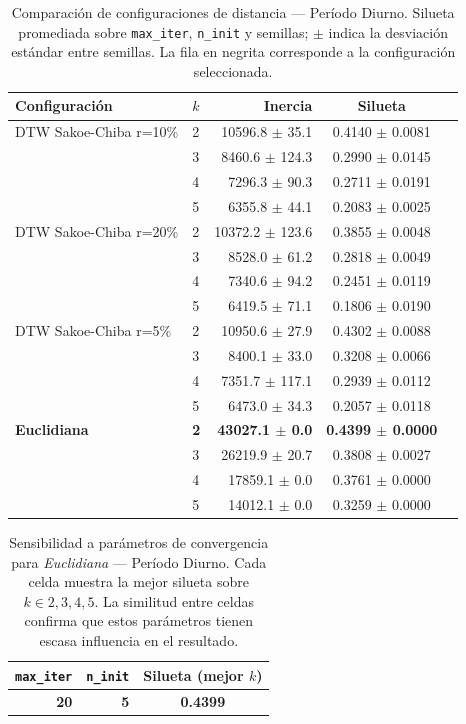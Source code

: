 \begin{table}[ht]
  \centering
  \caption{Comparación de configuraciones de distancia — Período Diurno. Silueta promediada sobre \texttt{max\_iter}, \texttt{n\_init} y semillas; $\pm$ indica la desviación estándar entre semillas. La fila en negrita corresponde a la configuración seleccionada.}
  \label{tab:tuning_config_daytime}
  \begin{tabular}{llrcc}
    \toprule
    \textbf{Configuración} & \textbf{$k$} & \textbf{Inercia} & \textbf{Silueta} \\
    \midrule
    DTW Sakoe-Chiba r=10\% & 2 & 10596.8 $\pm$ 35.1 & 0.4140 $\pm$ 0.0081 \\
     & 3 & 8460.6 $\pm$ 124.3 & 0.2990 $\pm$ 0.0145 \\
     & 4 & 7296.3 $\pm$ 90.3 & 0.2711 $\pm$ 0.0191 \\
     & 5 & 6355.8 $\pm$ 44.1 & 0.2083 $\pm$ 0.0025 \\
    DTW Sakoe-Chiba r=20\% & 2 & 10372.2 $\pm$ 123.6 & 0.3855 $\pm$ 0.0048 \\
     & 3 & 8528.0 $\pm$ 61.2 & 0.2818 $\pm$ 0.0049 \\
     & 4 & 7340.6 $\pm$ 94.2 & 0.2451 $\pm$ 0.0119 \\
     & 5 & 6419.5 $\pm$ 71.1 & 0.1806 $\pm$ 0.0190 \\
    DTW Sakoe-Chiba r=5\% & 2 & 10950.6 $\pm$ 27.9 & 0.4302 $\pm$ 0.0088 \\
     & 3 & 8400.1 $\pm$ 33.0 & 0.3208 $\pm$ 0.0066 \\
     & 4 & 7351.7 $\pm$ 117.1 & 0.2939 $\pm$ 0.0112 \\
     & 5 & 6473.0 $\pm$ 34.3 & 0.2057 $\pm$ 0.0118 \\
    \textbf{Euclidiana} & \textbf{2} & \textbf{43027.1 $\pm$ 0.0} & \textbf{0.4399 $\pm$ 0.0000} \\
     & 3 & 26219.9 $\pm$ 20.7 & 0.3808 $\pm$ 0.0027 \\
     & 4 & 17859.1 $\pm$ 0.0 & 0.3761 $\pm$ 0.0000 \\
     & 5 & 14012.1 $\pm$ 0.0 & 0.3259 $\pm$ 0.0000 \\
    \bottomrule
  \end{tabular}
\end{table}

\begin{table}[ht]
  \centering
  \caption{Sensibilidad a parámetros de convergencia para \textit{Euclidiana} — Período Diurno. Cada celda muestra la mejor silueta sobre $k \in {2,3,4,5}$. La similitud entre celdas confirma que estos parámetros tienen escasa influencia en el resultado.}
  \label{tab:tuning_conv_daytime}
  \begin{tabular}{rrc}
    \toprule
    \textbf{\texttt{max\_iter}} & \textbf{\texttt{n\_init}} & \textbf{Silueta (mejor $k$)} \\
    \midrule
    \textbf{20} & \textbf{5} & \textbf{0.4399} \\
    \bottomrule
  \end{tabular}
\end{table}

